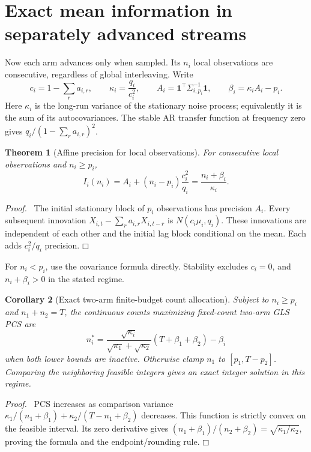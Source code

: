 \documentclass[11pt]{article}
\newtheorem{theorem}{Theorem}
\newtheorem{corollary}[theorem]{Corollary}
\newenvironment{proof}{\par\noindent\textit{Proof.}\ }{\hfill$\mdlgwhtsquare$\par\medskip}
\begin{document}
\section{Exact mean information in separately advanced streams}
Now each arm advances only when sampled. Its $n_i$ local observations are consecutive, regardless of global interleaving. Write
\begin{equation}
c_i=1-\sum_ra_{i,r},\qquad
\kappa_i=\frac{q_i}{c_i^2},\qquad
A_i=\mathbf1^\top\Sigma_{i,p_i}^{-1}\mathbf1,\qquad
\beta_i=\kappa_iA_i-p_i.
\end{equation}
Here $\kappa_i$ is the long-run variance of the stationary noise process; equivalently it is the sum of its autocovariances. The stable AR transfer function at frequency zero gives $q_i/(1-\sum_ra_{i,r})^2$.

\begin{theorem}[Affine precision for local observations]
For consecutive local observations and $n_i\geq p_i$,
\begin{equation}
\boxed{I_i(n_i)=A_i+(n_i-p_i)\frac{c_i^2}{q_i}
=\frac{n_i+\beta_i}{\kappa_i}.}
\label{eq:affine}
\end{equation}
\end{theorem}
\begin{proof}
The initial stationary block of $p_i$ observations has precision $A_i$. Every subsequent innovation
$X_{i,t}-\sum_ra_{i,r}X_{i,t-r}$ is $N(c_i\mu_i,q_i)$. These innovations are independent of each other and the initial lag block conditional on the mean. Each adds $c_i^2/q_i$ precision.
\end{proof}
For $n_i<p_i$, use the covariance formula directly. Stability excludes $c_i=0$, and $n_i+\beta_i>0$ in the stated regime.

\begin{corollary}[Exact two-arm finite-budget count allocation]
Subject to $n_i\geq p_i$ and $n_1+n_2=T$, the continuous counts maximizing fixed-count two-arm GLS PCS are
\begin{equation}
n_i^*=\frac{\sqrt{\kappa_i}}{\sqrt{\kappa_1}+\sqrt{\kappa_2}}
(T+\beta_1+\beta_2)-\beta_i
\end{equation}
when both lower bounds are inactive. Otherwise clamp $n_1$ to $[p_1,T-p_2]$. Comparing the neighboring feasible integers gives an exact integer solution in this regime.
\end{corollary}
\begin{proof}
PCS increases as comparison variance
$\kappa_1/(n_1+\beta_1)+\kappa_2/(T-n_1+\beta_2)$ decreases. This function is strictly convex on the feasible interval. Its zero derivative gives $(n_1+\beta_1)/(n_2+\beta_2)=\sqrt{\kappa_1/\kappa_2}$, proving the formula and the endpoint/rounding rule.
\end{proof}
\end{document}

